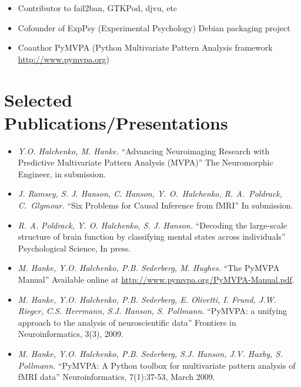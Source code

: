 \documentclass[12pt,overlapped,line]{res}
\newcommand{\mtitle}[1]{``#1''}
\newcommand{\mauthors}[1]{ \textit{#1.}}
\newcommand{\mwhere}[1]{#1.}
\begin{document}
\begin{resume}
\begin{description}
\begin{itemize}
      \item Contributor to fail2ban, GTKPod, djvu, etc

      \item Cofounder of ExpPsy (Experimental Psychology) Debian
        packaging project

      \item Coauthor PyMVPA (Python Multivariate Pattern Analysis
        framework \\ \url{http://www.pymvpa.org})

    \end{itemize}
  \end{description}

 \section{Selected Publications/Presentations}

 \begin{itemize}

 \item
   \mauthors{Y.O. Halchenko, M. Hanke}
    \mtitle{Advancing Neuroimaging Research with Predictive Multivariate
Pattern Analysis (MVPA)}
    \mwhere{The Neuromorphic Engineer, in submission}

 \item
   \mauthors{J. Ramsey, S. J. Hanson, C. Hanson, Y. O.~Halchenko,
     R. A.~Poldrack, C.~Glymour}
   \mtitle{Six Problems for Causal Inference from fMRI}
   \mwhere{In submission}

 \item
   \mauthors{R. A. Poldrack, Y. O. Halchenko, S. J. Hanson}
   \mtitle{Decoding the large-scale structure of brain function by
     classifying mental states across individuals}
   \mwhere{Psychological Science, In press}

  \item
    \mauthors{M. Hanke, Y.O. Halchenko, P.B. Sederberg, M. Hughes}
    \mtitle{The PyMVPA Manual}
    \mwhere{\newline Available online at \url{http://www.pymvpa.org/PyMVPA-Manual.pdf}}

 \item
   \mauthors{ M. Hanke, Y.O. Halchenko, P.B. Sederberg, E. Olivetti, I. Frund, J.W. Rieger, C.S. Herrmann, S.J. Hanson, S. Pollmann}
    \mtitle{PyMVPA: a unifying approach to the analysis of neuroscientific data}
    \mwhere{Frontiers in Neuroinformatics, 3(3), 2009}

  \item
    \mauthors{M. Hanke, Y.O. Halchenko, P.B. Sederberg, S.J. Hanson, J.V. Haxby, S. Pollmann}
    \mtitle{PyMVPA: A Python toolbox for multivariate pattern analysis of fMRI data}
    \mwhere{Neuroinformatics, 7(1):37-53, March 2009}


\end{itemize}
\end{resume}
\end{document}
